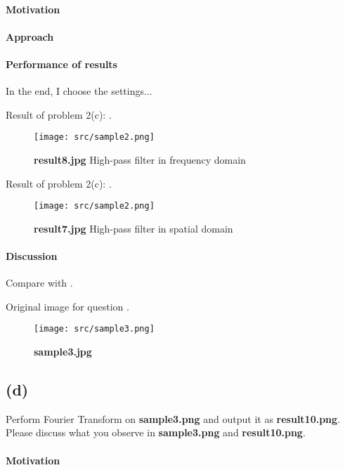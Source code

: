 \paragraph{Motivation}

\paragraph{Approach}

\paragraph{Performance of results}
In the end, I choose the \alert{settings}...

Result of problem 2(c): .
\begin{figure}
    \centering
    \texttt{[image: src/sample2.png]}
    \caption{\textbf{result8.jpg} High-pass filter in frequency domain}
    \label{result8}
\end{figure}

Result of problem 2(c): .
\begin{figure}
    \centering
    \texttt{[image: src/sample2.png]}
    \caption{\textbf{result7.jpg} High-pass filter in spatial domain}
    \label{result9}
\end{figure}

\paragraph{Discussion}
Compare  with .

Original image  for question  .
\begin{figure}
    \centering
    \texttt{[image: src/sample3.png]}
    \caption{\textbf{sample3.jpg}}
    \label{sample3}
\end{figure}

\subsection{(d)}\label{2_d}
Perform Fourier Transform on \textbf{sample3.png} and output it as \textbf{result10.png}. Please discuss what you observe in \textbf{sample3.png} and \textbf{result10.png}.

\paragraph{Motivation}


